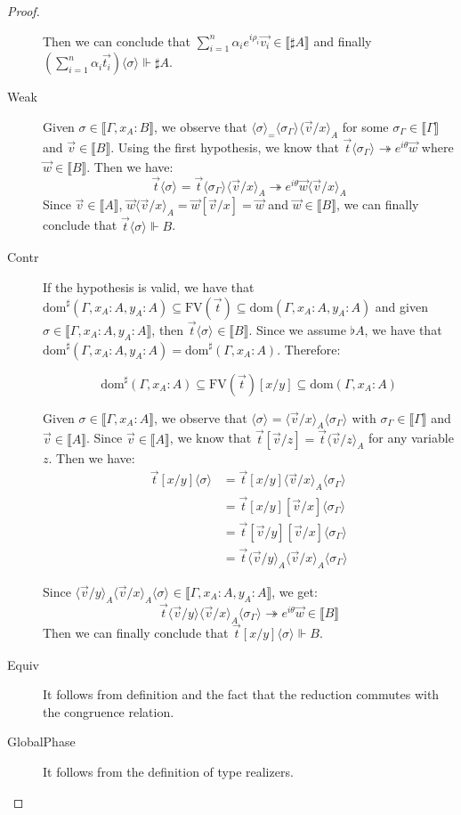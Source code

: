 \documentclass[runningheads,orivec]{llncs}
\newcommand\ansubst[2]{\ensuremath{\langle #1 \rangle_{#2}}}
\newcommand\dom[1]{\mathrm{dom}(#1)}
\newcommand\sdom[1]{\mathrm{dom}^{\sharp}(#1)}
\newcommand\FV[1]{\mathrm{FV}(#1)}
\def\eval{\twoheadrightarrow}
\def\sem#1{\llbracket#1\rrbracket}
\def\real{\Vdash}
\begin{document}
\begin{proof}
\begin{description}
    Then we can conclude that $\sum_{i=1}^{n}\alpha_i e^{i\rho_i}\vec{v_i}\in\sem{\sharp A}$ and finally $(\sum_{i=1}^{n}\alpha_i\vec{t_i})\ansubst{\sigma}{}\real\sharp A$.

    \item[Weak] Given $\sigma\in\sem{\Gamma,x_A:B}$, we observe that $\ansubst{\sigma}=\ansubst{\sigma_\Gamma}{}\ansubst{\vec{v}/x}{A}$ for some $\sigma_\Gamma\in\sem{\Gamma}$ and $\vec{v}\in\sem{B}$. Using the first hypothesis, we know that $\vec{t}\ansubst{\sigma_\Gamma}{}\eval e^{i\theta}\vec{w}$ where $\vec{w}\in\sem{B}$. Then we have:
    \[
    \vec{t}\ansubst{\sigma}{}=\vec{t}\ansubst{\sigma_\Gamma}{}\ansubst{\vec{v}/x}{A}\eval e^{i\theta}\vec{w}\ansubst{\vec{v}/x}{A}
    \]
    Since $\vec{v}\in\sem{A}$, $\vec{w}\ansubst{\vec{v}/x}{A}=\vec{w}[\vec{v}/x]=\vec{w}$ and $\vec{w}\in\sem{B}$, we can finally conclude that $\vec{t}\ansubst{\sigma}{}\real B$.

    \item[Contr] If the hypothesis is valid, we have that $\sdom{\Gamma, x_A:A, y_A:A}\subseteq\FV{\vec{t}}\subseteq\dom{\Gamma,x_A:A, y_A:A}$ and given $\sigma\in\sem{\Gamma,x_A:A, y_A:A}$, then $\vec{t}\ansubst{\sigma}{}\in\sem{B}$. Since we assume $\flat A$, we have that $\sdom{\Gamma,x_A:A, y_A:A}=\sdom{\Gamma,x_A:A}$. Therefore:
    
    \[
    \sdom{\Gamma,x_A:A}\subseteq\FV{\vec{t}}[x/y]\subseteq\dom{\Gamma,x_A:A}
    \]

    Given $\sigma\in\sem{\Gamma,x_A:A}$, we observe that $\ansubst{\sigma}{}=\ansubst{\vec{v}/x}{A}\ansubst{\sigma_\Gamma}{}$ with $\sigma_\Gamma\in\sem{\Gamma}$ and $\vec{v}\in\sem{A}$. Since $\vec{v}\in\sem{A}$, we know that $\vec{t}[\vec v/z] =\vec{t}\ansubst{\vec{v}/z}{A}$ for any variable $z$. Then we have:
    \begin{align*}
        \vec{t}[x/y]\ansubst{\sigma}{} &= \vec{t}[x/y]\ansubst{\vec{v}/x}{A}\ansubst{\sigma_\Gamma}{}\\
        &=\vec{t}[x/y][\vec{v}/x]\ansubst{\sigma_\Gamma}{}\\
        &=\vec{t}[\vec{v}/y][\vec{v}/x]\ansubst{\sigma_\Gamma}{}\\
        &=\vec{t}\ansubst{\vec{v}/y}{A}\ansubst{\vec{v}/x}{A}\ansubst{\sigma_\Gamma}{}    
    \end{align*}
    
    Since $\ansubst{\vec{v}/y}{A}\ansubst{\vec{v}/x}{A}\ansubst{\sigma}{}\in\sem{\Gamma,x_A:A,y_A:A}$, we get:
    \[\vec{t}\ansubst{\vec{v}/y}{}\ansubst{\vec{v}/x}{A}\ansubst{\sigma_\Gamma}{}\eval e^{i\theta}\vec{w}\in\sem{B}\]
    Then we can finally conclude that $\vec{t}[x/y]\ansubst{\sigma}{}\real B$.

    \item[Equiv] It follows from definition and the fact that the reduction commutes with the congruence relation.
    
    \item[GlobalPhase] It follows from the definition of type realizers.
    \end{description}
\end{proof}
\end{document}
